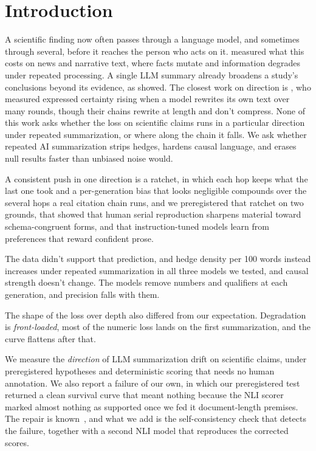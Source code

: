 \documentclass{article}
\begin{document}
\section{Introduction}

A scientific finding now often passes through a language model, and sometimes through several, before it reaches the person who acts on it. \citet{mohamed2025telephone} measured what this costs on news and narrative text, where facts mutate and information degrades under repeated processing. A single LLM summary already broadens a study's conclusions beyond its evidence, as \citet{peters2025generalization} showed. The closest work on direction is \citet{belem2026certainty}, who measured expressed certainty rising when a model rewrites its own text over many rounds, though their chains rewrite at length and don't compress. None of this work asks whether the loss on scientific claims runs in a particular direction under repeated summarization, or where along the chain it falls. We ask whether repeated AI summarization strips hedges, hardens causal language, and erases null results faster than unbiased noise would.

A consistent push in one direction is a ratchet, in which each hop keeps what the last one took and a per-generation bias that looks negligible compounds over the several hops a real citation chain runs, and we preregistered that ratchet on two grounds, that \citet{bartlett1932remembering} showed that human serial reproduction sharpens material toward schema-congruent forms, and that instruction-tuned models learn from preferences that reward confident prose.

The data didn't support that prediction, and hedge density per 100 words instead increases under repeated summarization in all three models we tested, and causal strength doesn't change. The models remove numbers and qualifiers at each generation, and precision falls with them.

The shape of the loss over depth also differed from our expectation. Degradation is \emph{front-loaded}, most of the numeric loss lands on the first summarization, and the curve flattens after that.

We measure the \emph{direction} of LLM summarization drift on scientific claims, under preregistered hypotheses and deterministic scoring that needs no human annotation. We also report a failure of our own, in which our preregistered test returned a clean survival curve that meant nothing because the NLI scorer marked almost nothing as supported once we fed it document-length premises. The repair is known~\citep{laban2022summac}, and what we add is the self-consistency check that detects the failure, together with a second NLI model that reproduces the corrected scores.
\end{document}
